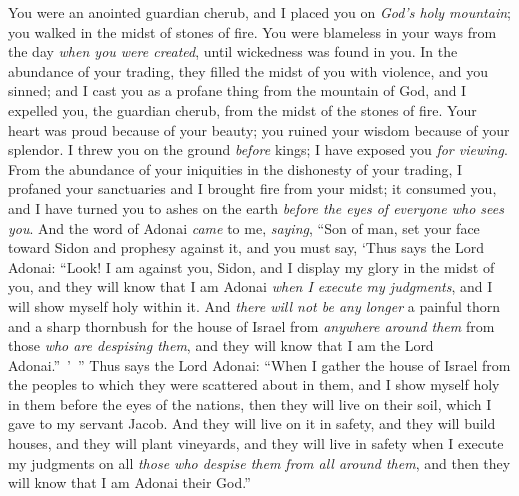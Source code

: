 \begin{biblechapter}
\verse You were an anointed guardian cherub, 
and I placed you on \textit{God’s holy mountain}; 
you walked in the midst of stones of fire.
\verse You were blameless in your ways 
from the day \textit{when you were created}, 
until wickedness was found in you.
\verse In the abundance of your trading, 
they filled the midst of you with violence, and you sinned; 
and I cast you as a profane thing from the mountain of God, 
and I expelled you, the guardian cherub, 
from the midst of the stones of fire.
\verse Your heart was proud because of your beauty; 
you ruined your wisdom because of your splendor. 
I threw you on the ground \textit{before} kings; 
I have exposed you \textit{for viewing}.
\verse From the abundance of your iniquities 
in the dishonesty of your trading, 
I profaned your sanctuaries 
and I brought fire from your midst; 
it consumed you, and I have turned you to ashes on the earth 
\textit{before the eyes of everyone who sees you}.
\verse And the word of Adonai \textit{came} to me, \textit{saying},
\verse “Son of man, set your face toward Sidon and prophesy against it,
\verse and you must say, ‘Thus says the Lord Adonai:
\verse “Look! I am against you, Sidon, 
and I display my glory in the midst of you, 
and they will know that I am Adonai 
\textit{when I execute my judgments}, 
and I will show myself holy within it.
\verse And \textit{there will not be any longer} a painful thorn and a sharp thornbush for the house of Israel from \textit{anywhere around them} from those \textit{who are despising them}, and they will know that I am the Lord Adonai.” ’ ”
\verse Thus says the Lord Adonai: “When I gather the house of Israel from the peoples to which they were scattered about in them, and I show myself holy in them before the eyes of the nations, then they will live on their soil, which I gave to my servant Jacob.
\verse And they will live on it in safety, and they will build houses, and they will plant vineyards, and they will live in safety when I execute my judgments on all \textit{those who despise them from all around them}, and then they will know that I am Adonai their God.”
\end{biblechapter}

